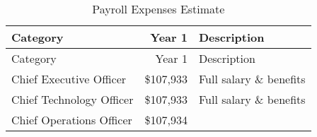 \documentclass[10pt,openany]{book}
\begin{document}
\begin{longtable}[]{@{}lrl@{}}
\caption{Payroll Expenses Estimate}\tabularnewline
\toprule
\begin{minipage}[b]{0.34\columnwidth}\raggedright
Category\strut
\end{minipage} & \begin{minipage}[b]{0.16\columnwidth}\raggedleft
Year 1\strut
\end{minipage} & \begin{minipage}[b]{0.32\columnwidth}\raggedright
Description\strut
\end{minipage}\tabularnewline
\midrule
\endfirsthead
\toprule
\begin{minipage}[b]{0.34\columnwidth}\raggedright
Category\strut
\end{minipage} & \begin{minipage}[b]{0.16\columnwidth}\raggedleft
Year 1\strut
\end{minipage} & \begin{minipage}[b]{0.32\columnwidth}\raggedright
Description\strut
\end{minipage}\tabularnewline
\midrule
\endhead
\begin{minipage}[t]{0.34\columnwidth}\raggedright
Chief Executive Officer\strut
\end{minipage} & \begin{minipage}[t]{0.16\columnwidth}\raggedleft
\$107,933\strut
\end{minipage} & \begin{minipage}[t]{0.32\columnwidth}\raggedright
Full salary \& benefits\strut
\end{minipage}\tabularnewline
\begin{minipage}[t]{0.34\columnwidth}\raggedright
Chief Technology Officer\strut
\end{minipage} & \begin{minipage}[t]{0.16\columnwidth}\raggedleft
\$107,933\strut
\end{minipage} & \begin{minipage}[t]{0.32\columnwidth}\raggedright
Full salary \& benefits\strut
\end{minipage}\tabularnewline
\begin{minipage}[t]{0.34\columnwidth}\raggedright
Chief Operations Officer\strut
\end{minipage} & \begin{minipage}[t]{0.16\columnwidth}\raggedleft
\$107,934\strut
\end{minipage} & \begin{minipage}[t]{0.32\columnwidth}\raggedright

\end{minipage}
\end{longtable}
\end{document}
